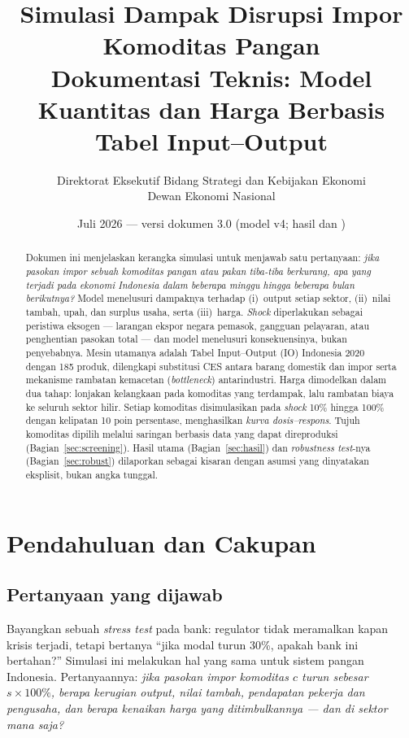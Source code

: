 \documentclass[11pt,a4paper]{article}
\title{\textbf{Simulasi Dampak Disrupsi Impor Komoditas Pangan\\
\large Dokumentasi Teknis: Model Kuantitas dan Harga Berbasis Tabel Input--Output}}
\author{Direktorat Eksekutif Bidang Strategi dan Kebijakan Ekonomi\\
Dewan Ekonomi Nasional}
\date{Juli 2026 --- versi dokumen 3.0 (model v4; hasil dan \en{robustness test})}
\newcommand{\en}[1]{\textit{#1}}   %
\begin{document}
\maketitle

\begin{abstract}
\noindent
Dokumen ini menjelaskan kerangka simulasi untuk menjawab satu pertanyaan:
\emph{jika pasokan impor sebuah komoditas pangan atau pakan tiba-tiba
berkurang, apa yang terjadi pada ekonomi Indonesia dalam beberapa minggu
hingga beberapa bulan berikutnya?} Model menelusuri dampaknya terhadap
(i)~output setiap sektor, (ii)~nilai tambah, upah, dan surplus usaha, serta
(iii)~harga. \en{Shock} diperlakukan sebagai peristiwa eksogen ---
larangan ekspor negara pemasok, gangguan pelayaran, atau penghentian
pasokan total --- dan model menelusuri konsekuensinya, bukan penyebabnya.
Mesin utamanya adalah Tabel Input--Output (IO) Indonesia 2020 dengan 185
produk, dilengkapi substitusi CES antara barang domestik dan impor serta
mekanisme rambatan kemacetan (\en{bottleneck}) antarindustri. Harga
dimodelkan dalam dua tahap: lonjakan kelangkaan pada komoditas yang
terdampak, lalu rambatan biaya ke seluruh sektor hilir. Setiap komoditas
disimulasikan pada \en{shock} 10\% hingga 100\% dengan kelipatan 10 poin
persentase, menghasilkan \emph{kurva dosis--respons}. Tujuh komoditas
dipilih melalui saringan berbasis data yang dapat direproduksi
(Bagian~\ref{sec:screening}). Hasil
utama (Bagian~\ref{sec:hasil}) dan \en{robustness test}-nya
(Bagian~\ref{sec:robust}) dilaporkan sebagai kisaran dengan asumsi yang
dinyatakan eksplisit, bukan angka tunggal.
\end{abstract}

\tableofcontents
\clearpage

\section{Pendahuluan dan Cakupan}

\subsection{Pertanyaan yang dijawab}

Bayangkan sebuah \en{stress test} pada bank: regulator tidak meramalkan
kapan krisis terjadi, tetapi bertanya ``jika modal turun 30\%, apakah bank
ini bertahan?'' Simulasi ini melakukan hal yang sama untuk sistem pangan
Indonesia. Pertanyaannya: \emph{jika pasokan impor komoditas $c$ turun
sebesar $s \times 100\%$, berapa kerugian output, nilai tambah, pendapatan
pekerja dan pengusaha, dan berapa kenaikan harga yang ditimbulkannya ---
dan di sektor mana saja?}
\end{document}
